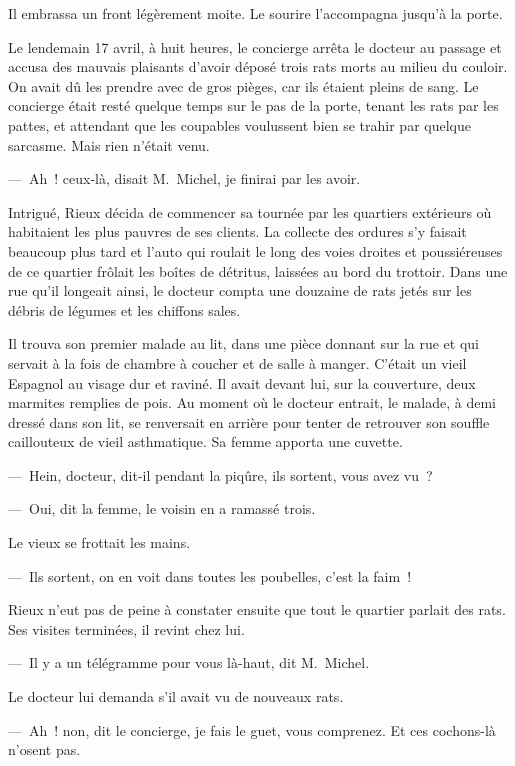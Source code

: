 \documentclass[french,twoside]{book} %
\begin{document}
Il embrassa un front légèrement moite. Le sourire l’accompagna jusqu’à la porte.\par
Le lendemain 17 avril, à huit heures, le concierge arrêta le docteur au passage et accusa des mauvais plaisants d’avoir déposé trois rats morts au milieu du couloir. On avait dû les prendre avec de gros pièges, car ils étaient pleins de sang. Le concierge était resté quelque temps sur le pas de la porte, tenant les rats par les pattes, et attendant que les coupables voulussent bien se trahir par quelque sarcasme. Mais rien n’était venu.\par
— Ah ! ceux-là, disait M. Michel, je finirai par les avoir.\par
Intrigué, Rieux décida de commencer sa tournée par les quartiers extérieurs où habitaient les plus pauvres de ses clients. La collecte des ordures s’y faisait beaucoup plus tard et l’auto qui roulait le long des voies droites et poussiéreuses de ce quartier frôlait les boîtes de détritus, laissées au bord du trottoir. Dans une rue qu’il longeait ainsi, le docteur compta une douzaine de rats jetés sur les débris de légumes et les chiffons sales.\par
Il trouva son premier malade au lit, dans une pièce donnant sur la rue et qui servait à la fois de chambre à coucher et de salle à manger. C’était un vieil Espagnol au visage dur et raviné. Il avait devant lui, sur la couverture, deux marmites remplies de pois. Au moment où le docteur entrait, le malade, à demi dressé dans son lit, se renversait en arrière pour tenter de retrouver son souffle caillouteux de vieil asthmatique. Sa femme apporta une cuvette.\par
— Hein, docteur, dit-il pendant la piqûre, ils sortent, vous avez vu ?\par
— Oui, dit la femme, le voisin en a ramassé trois.\par
Le vieux se frottait les mains.\par
— Ils sortent, on en voit dans toutes les poubelles, c’est la faim !\par
Rieux n’eut pas de peine à constater ensuite que tout le quartier parlait des rats. Ses visites terminées, il revint chez lui.\par
— Il y a un télégramme pour vous là-haut, dit M. Michel.\par
Le docteur lui demanda s’il avait vu de nouveaux rats.\par
— Ah ! non, dit le concierge, je fais le guet, vous comprenez. Et ces cochons-là n’osent pas.\par
\end{document}
